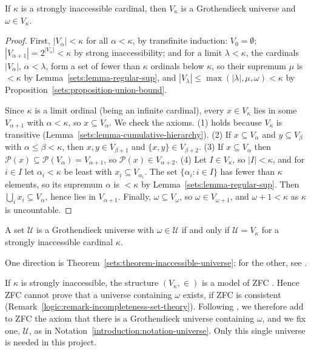 \begin{theorem}\label{sets:theorem-inaccessible-universe}
If $\kappa$ is a strongly inaccessible cardinal, then $V_\kappa$ is a
Grothendieck universe and $\omega \in V_\kappa$.
\end{theorem}

\begin{proof}
First, $|V_\alpha| < \kappa$ for all $\alpha < \kappa$, by transfinite induction:
$V_0 = \emptyset$; $|V_{\alpha + 1}| = 2^{|V_\alpha|} < \kappa$ by strong
inaccessibility; and for a limit $\lambda < \kappa$, the cardinals
$|V_\alpha|$, $\alpha < \lambda$, form a set of fewer than $\kappa$ ordinals below
$\kappa$, so their supremum $\mu$ is $< \kappa$ by
Lemma~\ref{sets:lemma-regular-sup}, and
$|V_\lambda| \leq \max(|\lambda|, \mu, \omega) < \kappa$ by
Proposition~\ref{sets:proposition-union-bound}.

Since $\kappa$ is a limit ordinal (being an infinite cardinal), every
$x \in V_\kappa$ lies in some $V_{\alpha + 1}$ with $\alpha < \kappa$, so
$x \subseteq V_\alpha$. We check the axioms. (1) holds because $V_\kappa$ is
transitive (Lemma~\ref{sets:lemma-cumulative-hierarchy}). (2) If
$x \subseteq V_\alpha$ and $y \subseteq V_\beta$ with $\alpha \leq \beta < \kappa$,
then $x, y \in V_{\beta + 1}$ and $\{x, y\} \in V_{\beta + 2}$. (3) If
$x \subseteq V_\alpha$ then $\mathcal{P}(x) \subseteq \mathcal{P}(V_\alpha) = V_{\alpha+1}$,
so $\mathcal{P}(x) \in V_{\alpha + 2}$. (4) Let $I \in V_\kappa$, so $|I| < \kappa$,
and for $i \in I$ let $\alpha_i < \kappa$ be least with $x_i \subseteq V_{\alpha_i}$.
The set $\{\alpha_i : i \in I\}$ has fewer than $\kappa$ elements, so its supremum
$\alpha$ is $< \kappa$ by Lemma~\ref{sets:lemma-regular-sup}. Then
$\bigcup_i x_i \subseteq V_\alpha$, hence lies in $V_{\alpha + 1}$. Finally,
$\omega \subseteq V_\omega$, so $\omega \in V_{\omega + 1}$, and
$\omega + 1 < \kappa$ as $\kappa$ is uncountable.
\end{proof}

\begin{theorem}\label{sets:theorem-universes-inaccessibles}
A set $\mathcal{U}$ is a Grothendieck universe with $\omega \in \mathcal{U}$ if and
only if $\mathcal{U} = V_\kappa$ for a strongly inaccessible cardinal $\kappa$.
\end{theorem}

One direction is Theorem~\ref{sets:theorem-inaccessible-universe}; for the
other, see \cite[Expos\'e I, Appendice]{sga4-1}.

\begin{remark}\label{sets:remark-universe-axiom}
If $\kappa$ is strongly inaccessible, the structure $(V_\kappa, \in)$ is a model
of ZFC \cite[Chapter 12]{jech-set-theory}. Hence ZFC cannot prove that a
universe containing $\omega$ exists, if ZFC is consistent
(Remark~\ref{logic:remark-incompleteness-set-theory}). Following
\cite{sga4-1}, we therefore add to ZFC the axiom that there is a Grothendieck
universe containing $\omega$, and we fix one, $\mathcal{U}$, as in
Notation~\ref{introduction:notation-universe}. Only this single universe is
needed in this project.
\end{remark}

